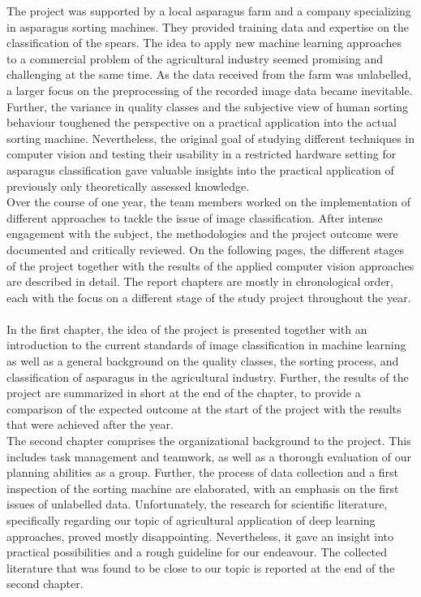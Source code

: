 The project was supported by a local asparagus farm and a company specializing in asparagus sorting machines. They provided training data and expertise on the classification of the spears. The idea to apply new machine learning approaches to a commercial problem of the agricultural industry seemed promising and challenging at the same time. As the data received from the farm was unlabelled, a larger focus on the preprocessing of the recorded image data became inevitable. Further, the variance in quality classes and the subjective view of human sorting behaviour toughened the perspective on a practical application into the actual sorting machine. Nevertheless, the original goal of studying different techniques in computer vision and testing their usability in a restricted hardware setting for asparagus classification gave valuable insights into the practical application of previously only theoretically assessed knowledge. \\
Over the course of one year, the team members worked on the implementation of different approaches to tackle the issue of image classification. After intense engagement with the subject, the methodologies and the project outcome were documented and critically reviewed. On the following pages, the different stages of the project together with the results of the applied computer vision approaches are described in detail. The report chapters are mostly in chronological order, each with the focus on a different stage of the study project throughout the year. \\
\\
In the first chapter, the idea of the project is presented together with an introduction to the current standards of image classification in machine learning as well as a general background on the quality classes, the sorting process, and classification of asparagus in the agricultural industry. Further, the results of the project are summarized in short at the end of the chapter, to provide a comparison of the expected outcome at the start of the project with the results that were achieved after the year. \\
The second chapter comprises the organizational background to the project. This includes task management and teamwork, as well as a thorough evaluation of our planning abilities as a group. Further, the process of data collection and a first inspection of the sorting machine are elaborated, with an emphasis on the first issues of unlabelled data. Unfortunately, the research for scientific literature, specifically regarding our topic of agricultural application of deep learning approaches, proved mostly disappointing. Nevertheless, it gave an insight into practical possibilities and a rough guideline for our endeavour. The collected literature that was found to be close to our topic is reported at the end of the second chapter. \\
